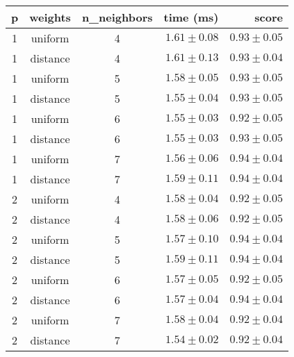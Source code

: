 \begin{tabular}{cccrr}
\toprule
\textbf{p} & \textbf{weights} & \textbf{n\_neighbors} & \textbf{time (ms)} & \textbf{score}\\
\midrule
1 & uniform & 4 & $1.61 \pm 0.08$ & $0.93 \pm 0.05$\\
1 & distance & 4 & $1.61 \pm 0.13$ & $0.93 \pm 0.04$\\
1 & uniform & 5 & $1.58 \pm 0.05$ & $0.93 \pm 0.05$\\
1 & distance & 5 & $1.55 \pm 0.04$ & $0.93 \pm 0.05$\\
1 & uniform & 6 & $1.55 \pm 0.03$ & $0.92 \pm 0.05$\\
1 & distance & 6 & $1.55 \pm 0.03$ & $0.93 \pm 0.05$\\
1 & uniform & 7 & $1.56 \pm 0.06$ & $0.94 \pm 0.04$\\
1 & distance & 7 & $1.59 \pm 0.11$ & $0.94 \pm 0.04$\\
2 & uniform & 4 & $1.58 \pm 0.04$ & $0.92 \pm 0.05$\\
2 & distance & 4 & $1.58 \pm 0.06$ & $0.92 \pm 0.05$\\
2 & uniform & 5 & $1.57 \pm 0.10$ & $0.94 \pm 0.04$\\
2 & distance & 5 & $1.59 \pm 0.11$ & $0.94 \pm 0.04$\\
2 & uniform & 6 & $1.57 \pm 0.05$ & $0.92 \pm 0.05$\\
2 & distance & 6 & $1.57 \pm 0.04$ & $0.94 \pm 0.04$\\
2 & uniform & 7 & $1.58 \pm 0.04$ & $0.92 \pm 0.04$\\
2 & distance & 7 & $1.54 \pm 0.02$ & $0.92 \pm 0.04$\\
\bottomrule
\end{tabular}
